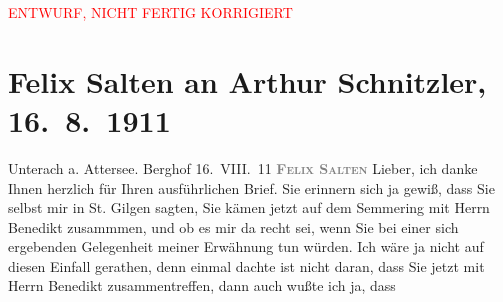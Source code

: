 
\begin{center}
            \textcolor{red}{ENTWURF, NICHT FERTIG KORRIGIERT}
                      \end{center}
            
         
         \renewcommand{\erwaehntePersonen}{Personen: Raoul Auernheimer, Moriz Benedikt, Samuel Fischer}
         \renewcommand{\erwaehnteInstitutionen}{Institutionen: Die Zeit}
         \renewcommand{\erwaehnteOrte}{Orte: Bad Gastein, Berghof, Semmering, St. Gilgen, Unterach am Attersee, Wien}
         \renewcommand{\erwaehnteWerke}{}
               \section[Felix Salten an Arthur Schnitzler, 16. 8. 1911]{ Felix Salten an Arthur Schnitzler, 16. 8. 1911}\nopagebreak{}\rehead{ }\begin{ledgroupsized}[t]{13cm}\normalsize\beginnumbering \toendnotes[C]{\smallbreak\pagebreak[2]} 
\pstart
           \noindent{}\raggedleft{}{\pb}Unterach a. Attersee. Berghof\pend
           \pstart
           \raggedleft{}16. VIII. 11\pend
           \pstart
           \textcolor{gray}{\textbf{\textsc{Felix Salten}}}\pend
           \pstart{}Lieber,\pend\pstart
           ich danke Ihnen herzlich für Ihren ausführlichen Brief. Sie erinnern sich ja gewiß,
               dass Sie selbst mir in St. Gilgen sagten, Sie kämen
               jetzt auf dem Semmering mit Herrn Benedikt zusammmen, und ob es mir da recht sei, wenn Sie bei einer
               sich ergebenden Gelegenheit meiner Erwähnung tun würden. Ich wäre ja nicht auf diesen
               Einfall gerathen, denn einmal dachte ist nicht daran, dass Sie jetzt mit Herrn Benedikt zusammentreffen, dann auch wußte ich ja, dass

\end{ledgroupsized}
